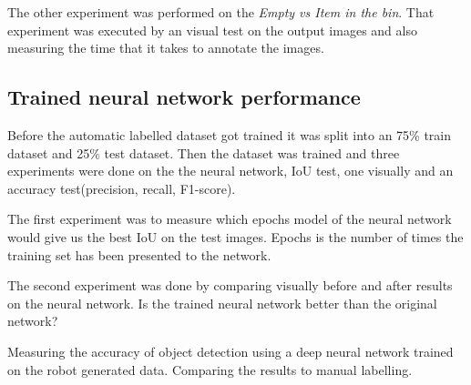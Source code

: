 The other experiment was performed on the \textit{Empty vs Item in the bin}. That experiment was executed by an visual test on the output images and also measuring the time that it takes to annotate the images.

\subsection{Trained neural network performance}
Before the automatic labelled dataset got trained it was split into an 75\% train dataset and 25\% test dataset. Then the dataset was trained and three experiments were done on the the neural network, IoU test, one visually and an accuracy test(precision, recall, F1-score).


The first experiment was to measure which epochs model of the neural network would give us the best IoU on the test images. Epochs is the number of times the training set has been presented to the network.

The second experiment was done by comparing visually before and after results on the neural network. Is the trained neural network better than the original network?

Measuring the accuracy of object detection using a deep neural network trained on the robot generated data. Comparing the results to manual labelling.


